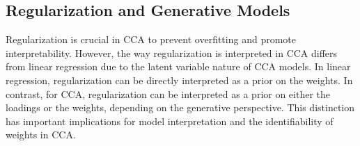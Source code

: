 \begin{table}[h]
    \centering
    \caption{Relationship Between Weights and Loadings in Population and Sample Cases}
    \label{tab:weights-loadings-population-sample}
\end{table}

\subsection{Regularization and Generative Models}

Regularization is crucial in CCA to prevent overfitting and promote interpretability. However, the way regularization is interpreted in CCA differs from linear regression due to the latent variable nature of CCA models. In linear regression, regularization can be directly interpreted as a prior on the weights. In contrast, for CCA, regularization can be interpreted as a prior on either the loadings or the weights, depending on the generative perspective. This distinction has important implications for model interpretation and the identifiability of weights in CCA.

